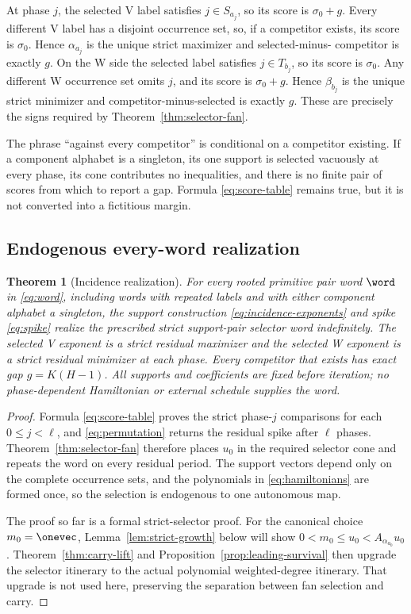 \documentclass[11pt,letterpaper]{article}
\newtheorem{theorem}{Theorem}[section]
\theoremstyle{definition}
\theoremstyle{remark}
\numberwithin{equation}{section}
\begin{document}
At phase \(j\), the selected V label satisfies \(j\in S_{a_j}\), so its
score is \(\sigma_0+g\).  Every different V label has a disjoint occurrence set,
so, if a competitor exists, its score is \(\sigma_0\).  Hence
\(\alpha_{a_j}\) is the unique strict maximizer and selected-minus-
competitor is exactly \(g\).  On the W side the selected label satisfies
\(j\in T_{b_j}\), so its score is \(\sigma_0\).  Any different W occurrence set
omits \(j\), and its score is \(\sigma_0+g\).  Hence \(\beta_{b_j}\) is the
unique strict minimizer and competitor-minus-selected is exactly \(g\).
These are precisely the signs required by Theorem~\ref{thm:selector-fan}.

The phrase ``against every competitor'' is conditional on a competitor
existing.  If a component alphabet is a singleton, its one support is
selected vacuously at every phase, its cone contributes no inequalities, and
there is no finite pair of scores from which to report a gap.  Formula
\eqref{eq:score-table} remains true, but it is not converted into a fictitious
margin.

\subsection{Endogenous every-word realization}

\begin{theorem}[Incidence realization]
\label{thm:incidence-realization}
For every rooted primitive pair word \(\word\) in \eqref{eq:word}, including
words with repeated labels and with either component alphabet a singleton,
the support construction \eqref{eq:incidence-exponents} and spike
\eqref{eq:spike} realize the prescribed strict support-pair selector word
indefinitely.  The selected V exponent is a strict residual maximizer and
the selected W exponent is a strict residual minimizer at each phase.  Every
competitor that exists has exact gap \(g=K(H-1)\).  All supports and
coefficients are fixed before iteration; no phase-dependent Hamiltonian or
external schedule supplies the word.
\end{theorem}

\begin{proof}
Formula \eqref{eq:score-table} proves the strict phase-\(j\) comparisons for
each \(0\leq j<\ell\), and \eqref{eq:permutation} returns the residual spike
after \(\ell\) phases.  Theorem~\ref{thm:selector-fan} therefore places
\(u_0\) in the required selector cone and repeats the word on every residual
period.  The support vectors depend only on the complete occurrence sets,
and the polynomials in \eqref{eq:hamiltonians} are formed once, so the
selection is endogenous to one autonomous map.

The proof so far is a formal strict-selector proof.  For the canonical
choice \(m_0=\onevec\), Lemma~\ref{lem:strict-growth} below will show
\(0<m_0\leq u_0<A_{\alpha_{a_0}}u_0\).  Theorem~\ref{thm:carry-lift} and
Proposition~\ref{prop:leading-survival} then upgrade the selector itinerary
to the actual polynomial weighted-degree itinerary.  That upgrade is not
used here, preserving the separation between fan selection and carry.
\end{proof}
\end{document}
